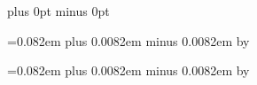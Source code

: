\def\flat#1{%
\endofglyph{2}%
}

\def\natural#1{%
\endofglyph{2}%
}



\def\begingregorioscore{%
\noindent%
}

\def\endgregorioscore{%
\localleftbox{}%
\localrightbox{}%
\par%
}

\def\endofword{%
\ifdim\enddifference >0pt %
\hskip\interwordspacenotes %
\else%
\hskip\interwordspacetext %
\fi
\penalty -1000%
\enddifference=0pt%
}

\def\endofsyllable{%
\penalty -500%
}


\def\endofelement#1{%
\ifcase#1%
\hskip\interelementspace%
\or%
\hskip\largerspace%
\or%
\hskip\glyphspace%
\fi%
\penalty -100%
}


\def\endofglyph#1{%
\ifcase#1%
\hskip\interglyphspace %
\or%
\hskip\zerowidthspace %
\or%
\hskip\alterationspace %
\or%
\hskip\punctuminclinatumshift %
\or%
\hskip\bispace %
\or%
\hskip\trispace %
\fi%
\penalty 10001%
}


\newskip\zerowidthspace
\zerowidthspace=0pt plus 0pt minus 0pt

\newskip\interglyphspace
\interglyphspace=0.082em plus 0.0082em minus 0.0082em
\multiply\interglyphspace by \factor

\newskip\alterationspace
\alterationspace=0.082em plus 0.0082em minus 0.0082em
\multiply\alterationspace by \factor

